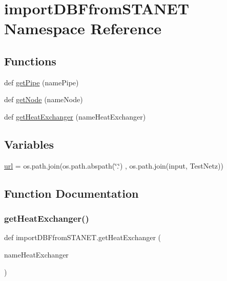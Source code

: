 \hypertarget{namespaceimport_d_b_ffrom_s_t_a_n_e_t}{}\section{import\+D\+B\+Ffrom\+S\+T\+A\+N\+ET Namespace Reference}
\label{namespaceimport_d_b_ffrom_s_t_a_n_e_t}
\subsection*{Functions}
\begin{DoxyCompactItemize}
\item 
def \hyperlink{namespaceimport_d_b_ffrom_s_t_a_n_e_t_a3baf717d83d4d6a45a03b13d4b01004c}{get\+Pipe} (name\+Pipe)
\item 
def \hyperlink{namespaceimport_d_b_ffrom_s_t_a_n_e_t_ad03c3058a85f1503b478dc90c3c3731c}{get\+Node} (name\+Node)
\item 
def \hyperlink{namespaceimport_d_b_ffrom_s_t_a_n_e_t_a0ba7b71809f0a165bb8c2dd53cec2c3d}{get\+Heat\+Exchanger} (name\+Heat\+Exchanger)
\end{DoxyCompactItemize}
\subsection*{Variables}
\begin{DoxyCompactItemize}
\item 
\hyperlink{namespaceimport_d_b_ffrom_s_t_a_n_e_t_add9cff8b414879d1bc29603a2a829364}{url} = os.\+path.\+join(os.\+path.\+abspath(\char`\"{}.\char`\"{}) , os.\+path.\+join(\textquotesingle{}input\textquotesingle{}, \textquotesingle{}Test\+Netz\textquotesingle{}))
\end{DoxyCompactItemize}


\subsection{Function Documentation}
\mbox{\label{namespaceimport_d_b_ffrom_s_t_a_n_e_t_a0ba7b71809f0a165bb8c2dd53cec2c3d}} 
\subsubsection{\texorpdfstring{get\+Heat\+Exchanger()}{getHeatExchanger()}}
{\footnotesize\ttfamily def import\+D\+B\+Ffrom\+S\+T\+A\+N\+E\+T.\+get\+Heat\+Exchanger (\begin{DoxyParamCaption}\item[{}]{name\+Heat\+Exchanger }\end{DoxyParamCaption})}

